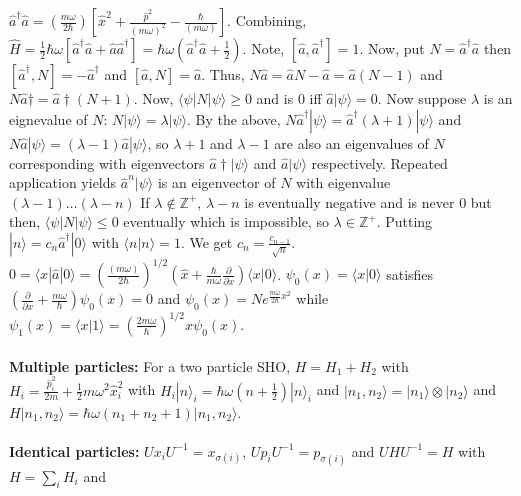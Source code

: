 $ \hat{a}^{\dagger} \hat{a} = ({\frac {m \omega}{2 \hbar}}) [ \hat{x}^2 + {\frac {\hat{p}^2} {(m \omega)^2}}
- {\frac {\hbar} {(m \omega)}} ] $.  Combining, $\hat{H}={\frac 1 2} \hbar \omega [ \hat{a}^{\dagger} \hat{a} + \hat{a} \hat{a}^{\dagger} ] =
\hbar \omega ( \hat{a}^{\dagger} \hat{a} + {\frac 1 2})$.  Note, $[\hat{a}, \hat{a}^{\dagger}]= 1$.
Now, put $N= \hat{a}^{\dagger} \hat{a}$ then $[\hat{a}^{\dagger}, N]= -\hat{a}^{\dagger}$ and
$[\hat{a}, N]= \hat{a}$.  Thus, $N \hat{a} = \hat{a}N - \hat{a}= \hat{a} (N-1)$ and
$N \hat{a}{\dagger} = \hat{a}{\dagger} (N+1)$.  Now, $\langle \psi | N | \psi \rangle \geq 0$ and is $0$ iff
$\hat{a} | \psi \rangle= 0$.  Now suppose $\lambda$ is an eignevalue of $N$:
$N |\psi \rangle = \lambda | \psi \rangle$.  By the above,
$N \hat{a}^{\dagger} | \psi \rangle = \hat{a}^{\dagger} (\lambda +1) | \psi \rangle$ and
$N \hat{a} | \psi \rangle = (\lambda -1) \hat{a} | \psi \rangle$,
so $\lambda+1$ and $\lambda-1$ are also an eigenvalues of $N$ corresponding with eigenvectors
$\hat{a}{\dagger}| \psi \rangle$ and $\hat{a} | \psi \rangle$ respectively.  Repeated application yields
$\hat{a}^n | \psi \rangle$ is an eigenvector of $N$ with eigenvalue $(\lambda -1) \ldots (\lambda -n)$
If $\lambda \notin {\mathbb Z}^{+}$, $\lambda -n$ is eventually negative and is never $0$  but then,
$\langle \psi | N | \psi \rangle \leq 0$ eventually which is impossible, so $\lambda \in {\mathbb Z}^{+}$.
Putting $| n \rangle= c_n \hat{a}^{\dagger} | 0 \rangle$ with $\langle n | n \rangle = 1$.  We get
$c_n = {\frac {c_{n-1}} {\sqrt n}}$.
$0= \langle x | \hat{a} | 0 \rangle =
({\frac {(m \omega)}{2 \hbar}})^{1/2} (\hat{x} + {\frac {\hbar}{m \omega}} {\frac {\partial} {\partial x}}) \langle x | 0 \rangle$.
$\psi_0(x) = \langle x | 0 \rangle$ satisfies $({\frac {\partial} {\partial x}} +{\frac {m \omega} {\hbar}}) \psi_0(x) =0$ and
$\psi_0(x)= N e^{{\frac {m \omega} {2 \hbar}} x^2}$ while 
$\psi_1(x)= \langle x | 1 \rangle= ({\frac {2m \omega} {\hbar}})^{1/2} x \psi_0(x)$.
\\
\\
{\bf Multiple particles:}  For a two particle SHO,
$H= H_1 + H_2$ with $H_i= {\frac  {\hat{p}_i^2}{2m}} + {\frac 1 2} m \omega^2 \hat{x}_i^2$ with
$H_i |n \rangle_i = \hbar \omega (n + {\frac 1 2}) |n\rangle_i$ and 
$ |n_1, n_2\rangle= |n_1\rangle  \otimes |n_2\rangle $ and $H |n_1, n_2 \rangle= \hbar \omega (n_1 + n_2 + 1) |n_1 , n_2 \rangle$.
\\
\\
{\bf Identical particles:}
$U x_i U^{-1}= x_{\sigma(i)}$, $U p_i U^{-1}= p_{\sigma(i)}$ and $U H U^{-1}= H$ with $H= \sum_i H_i$ and
